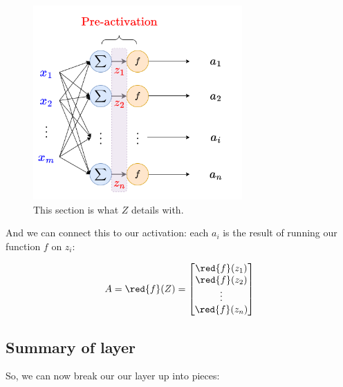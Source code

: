         \begin{figure}[H]
            \centering
            \includegraphics[width=80mm,scale=0.4]{images/nn_images/pre_activation.png}
            \caption*{This section is what $Z$ details with.}
        \end{figure}
        
        And we can connect this to our activation: each $a_i$ is the result of running our function $f$ on $z_i$:
        
        \begin{equation}
            A = 
            \red{f}(Z)=
            \begin{bmatrix}
              \red{f}(z_1) \\ \red{f}(z_2) \\ \vdots \\ \red{f}(z_n)
            \end{bmatrix}
        \end{equation}
        
    \subsection*{Summary of layer}
    
        So, we can now break our our layer up into pieces:\\
        
